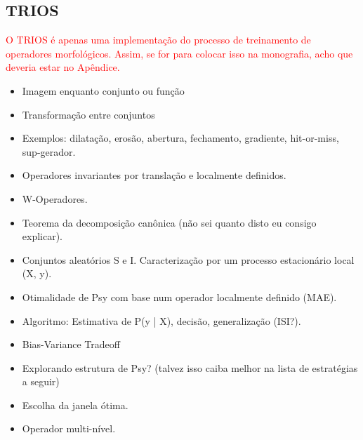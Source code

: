 \documentclass[a4paper,11pt]{article}
\newcommand{\TODO}[1]{\textcolor{red}{#1}}
\begin{document}
\subsection{TRIOS}

\TODO{O TRIOS é apenas uma implementação do processo de treinamento de
  operadores morfológicos. Assim, se for para colocar isso na
  monografia, acho que deveria estar no Apêndice.}
      \begin{itemize}
        \item Imagem enquanto conjunto ou função
        \item Transformação entre conjuntos
        \item Exemplos: dilatação, erosão, abertura, fechamento, gradiente, hit-or-miss, sup-gerador.
        \item Operadores invariantes por translação e localmente definidos.
        \item W-Operadores.
        \item Teorema da decomposição canônica (não sei quanto disto eu consigo explicar).
        \item Conjuntos aleatórios S e I. Caracterização por um processo estacionário local (X, y).
        \item Otimalidade de Psy com base num operador localmente definido (MAE).
        \item Algoritmo: Estimativa de P(y | X), decisão, generalização (ISI?).
        \item Bias-Variance Tradeoff
        \item Explorando estrutura de Psy? (talvez isso caiba melhor na lista de estratégias a seguir)
        \item Escolha da janela ótima.
        \item Operador multi-nível.
      \end{itemize}





%
{\small 
}
\end{document}
